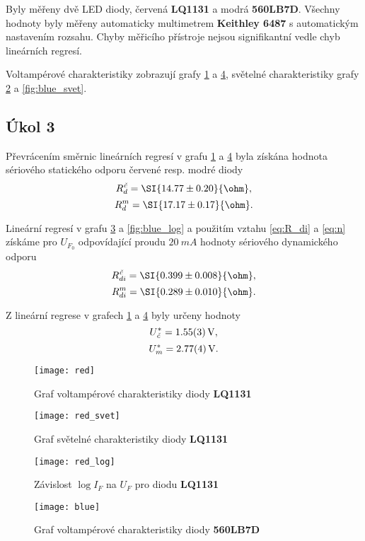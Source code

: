 \documentclass{protokol}
\begin{document}
      Byly měřeny dvě LED diody, červená \textbf{LQ1131} a modrá \textbf{560LB7D}. Všechny hodnoty byly měřeny automaticky multimetrem \textbf{Keithley 6487} s automatickým nastavením rozsahu. Chyby měřicího přístroje nejsou signifikantní vedle chyb lineárních regresí.

      Voltampérové charakteristiky zobrazují grafy \ref{fig:red} a \ref{fig:blue}, světelné charakteristiky grafy \ref{fig:red_svet} a \ref{fig:blue_svet}.

    \subsection*{Úkol 3}

      Převrácením směrnic lineárních regresí v grafu \ref{fig:red} a \ref{fig:blue} byla získána hodnota sériového statického odporu červené resp. modré diody
      $$ R_d^\textit{č} = \SI{14.77 \pm 0.20}{\ohm}, $$
      $$ R_d^m = \SI{17.17 \pm 0.17}{\ohm}. $$

      Lineární regresí v grafu \ref{fig:red_log} a \ref{fig:blue_log} a použitím vztahu \eqref{eq:R_di} a \eqref{eq:n} získáme pro $U_{F_0}$ odpovídající proudu $\SI{20}{mA}$ hodnoty sériového dynamického odporu
      $$ R_{di}^\textit{č} = \SI{0.399 \pm 0.008}{\ohm},$$
      $$ R_{di}^m = \SI{0.289 \pm 0.010}{\ohm}.$$

      Z lineární regrese v grafech \ref{fig:red} a \ref{fig:blue} byly určeny hodnoty 
      $$ U_\textit{č}^* = \SI{1.55 \pm 0.03}{V}, $$
      $$ U_m^* = \SI{2.77 \pm 0.04}{V}. $$


    \begin{figure}[H]
      \centering
      \texttt{[image: red]}
      \caption{Graf voltampérové charakteristiky diody \textbf{LQ1131}}
      \label{fig:red}
    \end{figure}

    \begin{figure}[H]
      \centering
      \texttt{[image: red\_svet]}
      \caption{Graf světelné charakteristiky diody \textbf{LQ1131}}
      \label{fig:red_svet}
    \end{figure}

    \begin{figure}[H]
      \centering
      \texttt{[image: red\_log]}
      \caption{Závislost $\log{I_F}$ na $U_F$ pro diodu \textbf{LQ1131}}
      \label{fig:red_log}
    \end{figure}

    \begin{figure}[H]
      \centering 
      \texttt{[image: blue]}
      \caption{Graf voltampérové charakteristiky diody \textbf{560LB7D}}
      \label{fig:blue}
    \end{figure}
\end{document}
